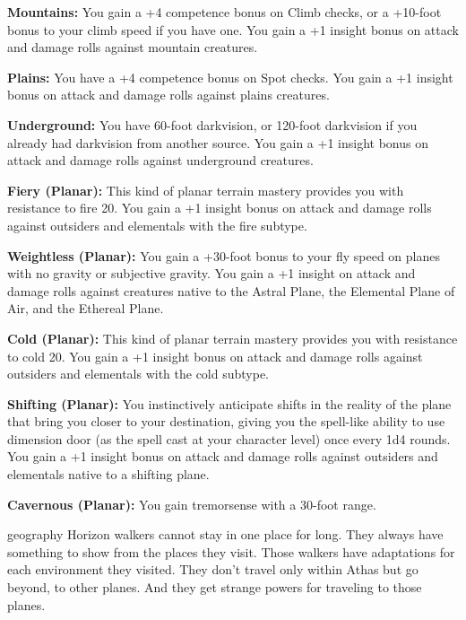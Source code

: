 {\textbf{Mountains:} You gain a +4 competence bonus on Climb checks, or a +10-foot bonus to your climb speed if you have one. You gain a +1 insight bonus on attack and damage rolls against mountain creatures.

\textbf{Plains:} You have a +4 competence bonus on Spot checks. You gain a +1 insight bonus on attack and damage rolls against plains creatures.

\textbf{Underground:} You have 60-foot darkvision, or 120-foot darkvision if you already had darkvision from another source. You gain a +1 insight bonus on attack and damage rolls against underground creatures.

\textbf{Fiery (Planar):} This kind of planar terrain mastery provides you with resistance to fire 20. You gain a +1 insight bonus on attack and damage rolls against outsiders and elementals with the fire subtype.

\textbf{Weightless (Planar):} You gain a +30-foot bonus to your fly speed on planes with no gravity or subjective gravity. You gain a +1 insight on attack and damage rolls against creatures native to the Astral Plane, the Elemental Plane of Air, and the Ethereal Plane.

\textbf{Cold (Planar):} This kind of planar terrain mastery provides you with resistance to cold 20. You gain a +1 insight bonus on attack and damage rolls against outsiders and elementals with the cold subtype.

\textbf{Shifting (Planar):} You instinctively anticipate shifts in the reality of the plane that bring you closer to your destination, giving you the spell-like ability to use dimension door (as the spell cast at your character level) once every 1d4 rounds. You gain a +1 insight bonus on attack and damage rolls against outsiders and elementals native to a shifting plane.

\textbf{Cavernous (Planar):} You gain tremorsense with a 30-foot range.
}
{}
{geography}
{Horizon walkers cannot stay in one place for long. They always have something to show from the places they visit.}
{Those walkers have adaptations for each environment they visited.}
{They don't travel only within Athas but go beyond, to other planes. And they get strange powers for traveling to those planes.}